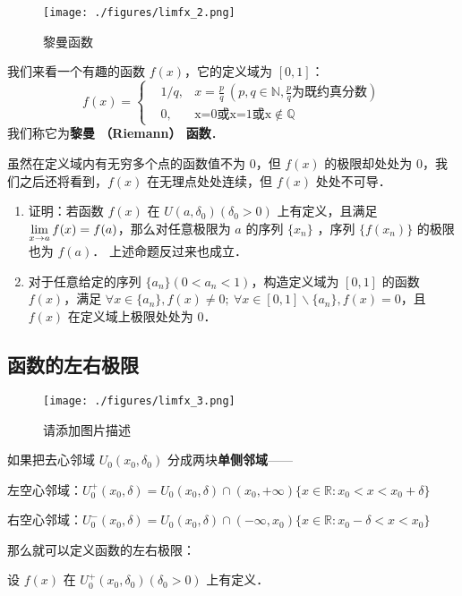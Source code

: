 \begin{figure}[ht]
\centering
\texttt{[image: ./figures/limfx\_2.png]}
\caption{黎曼函数} \label{limfx_fig2}
\end{figure}

我们来看一个有趣的函数 $f(x)$，它的定义域为 $[0,1]$：
\begin{equation}
f(x)=\left\{
\begin{aligned} 
&1/q, &x=\frac{p}{q}\ (p,q\in \mathbb{N},\frac{p}{q}\text{为既约真分数})\\
&0,&\text{x=0或x=1或x}\notin \mathbb{Q}
\end{aligned}
\right.
\end{equation}
我们称它为\textbf{黎曼 （Riemann） 函数}．

虽然在定义域内有无穷多个点的函数值不为 $0$，但 $f(x)$ 的极限却处处为 $0$，我们之后还将看到，$f(x)$ 在无理点处处连续，但 $f(x)$ 处处不可导．

\begin{exercise}{}
\begin{enumerate}
\item 证明：若函数 $f(x)$ 在 $U(a,\delta_0)(\delta_0>0)$ 上有定义，且满足 $\large\lim\limits_{x\rightarrow a}f(x)=f(a)$，那么对任意极限为 $a$ 的序列 $\{x_n\}$ ，序列 $\{f(x_n)\}$ 的极限也为 $f(a)$．
     上述命题反过来也成立．
\item 对于任意给定的序列 $\{a_n\}(0<a_n<1)$，构造定义域为 $[0,1]$ 的函数 $f(x)$，满足 $\forall x\in \{a_n\},f(x)\neq 0;\ \forall x \in [0,1]\backslash \{a_n\},f(x)=0$，且 $f(x)$ 在定义域上极限处处为 $0$．
\end{enumerate}
\end{exercise}
\subsection{函数的左右极限}
\begin{figure}[ht]
\centering
\texttt{[image: ./figures/limfx\_3.png]}
\caption{请添加图片描述} \label{limfx_fig3}
\end{figure}
  如果把去心邻域 $U_0(x_0,\delta_0)$ 分成两块\textbf{单侧邻域}——

  左空心邻域：$U_0^+(x_0,\delta)=U_0(x_0,\delta)\cap (x_0,+\infty) \{x\in \mathbb{R} :x_0< x<x_0+\delta\}$

  右空心邻域：$U_0^-(x_0,\delta)=U_0(x_0,\delta)\cap (-\infty,x_0) \{x\in \mathbb{R} :x_0-\delta< x<x_0\}$

  那么就可以定义函数的左右极限：

  设 $f(x)$ 在 $U^+_0(x_0,\delta_0)(\delta_0>0)$ 上有定义．

